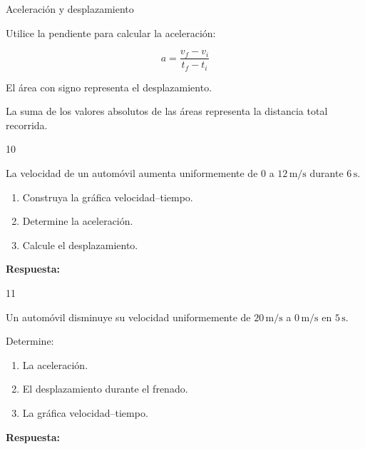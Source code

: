 \documentclass[11pt,letterpaper]{article}
\newcommand{\respuesta}{
 \par\vspace{0.3cm}
 \textcolor{morado}{\textbf{Respuesta:}}
 \hrulefill
 \par\vspace{0.3cm}
}
\newcommand{\espacio}[1]{
 \par\vspace{#1}
}
\begin{document}
\begin{seccion}{
Aceleración y desplazamiento
}

Utilice la pendiente para calcular
la aceleración:

\[
a=\frac{v_f-v_i}{t_f-t_i}
\]

El área con signo representa
el desplazamiento.

La suma de los valores absolutos
de las áreas representa la
distancia total recorrida.

\end{seccion}

\begin{ejercicio}{10}

La velocidad de un automóvil
aumenta uniformemente
de $0$ a $12\,\mathrm{m/s}$
durante $6\,\mathrm{s}$.

\begin{enumerate}[label=\alph*)]
\item Construya la gráfica velocidad--tiempo.
\item Determine la aceleración.
\item Calcule el desplazamiento.
\end{enumerate}

\espacio{5cm}
\respuesta

\end{ejercicio}
\newpage
\begin{ejercicio}{11}

Un automóvil disminuye
su velocidad uniformemente
de $20\,\mathrm{m/s}$
a $0\,\mathrm{m/s}$
en $5\,\mathrm{s}$.

Determine:

\begin{enumerate}[label=\alph*)]
\item La aceleración.
\item El desplazamiento durante el frenado.
\item La gráfica velocidad--tiempo.
\end{enumerate}

\espacio{5cm}
\respuesta

\end{ejercicio}

\newpage
\end{document}
